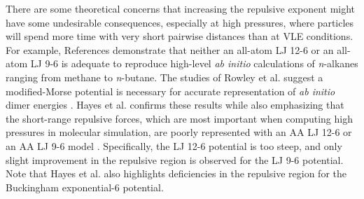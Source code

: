 \documentclass[preprint,letterpaper,floatfix,citeautoscript,aip,jcp]{revtex4-1}
\begin{document}
There are some theoretical concerns that increasing the repulsive exponent might have some undesirable consequences, especially at high pressures, where 
particles will spend more time with very short  pairwise distances
than at VLE conditions. For example, References  demonstrate that neither an all-atom LJ 12-6 or an all-atom LJ 9-6 is adequate to reproduce high-level \textit{ab initio} calculations of \textit{n}-alkanes ranging from methane to \textit{n}-butane. 
The studies of Rowley et al. suggest a modified-Morse potential is necessary for accurate representation of \textit{ab initio} dimer energies \cite{Rowley1999,Rowley2001}. Hayes et al. confirms these results while also emphasizing that the short-range repulsive forces, which are most important when computing high pressures in molecular simulation, are poorly represented with an AA LJ 12-6 or an AA LJ 9-6 model \cite{Hayes2004}. Specifically, the LJ 12-6 potential is too steep, and only slight improvement in the repulsive region is observed for the LJ 9-6 potential. %
Note that Hayes et al. also highlights deficiencies in the repulsive region for the Buckingham exponential-6 potential. 
\end{document}
